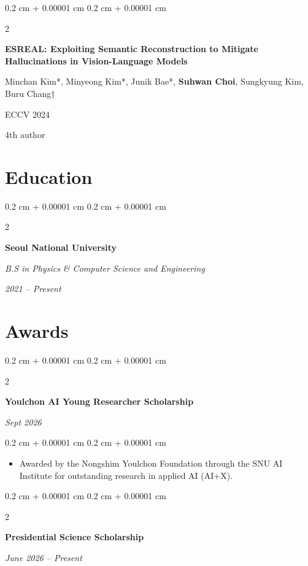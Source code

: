 \documentclass[10pt, letterpaper]{article}
\newenvironment{highlights}{
    \begin{itemize}[
        topsep=0.10 cm,
        parsep=0.10 cm,
        partopsep=0pt,
        itemsep=0pt,
        leftmargin=0.4 cm + 10pt
    ]
}{
    \end{itemize}
} %
\newenvironment{onecolentry}{
    \begin{adjustwidth}{
        0.2 cm + 0.00001 cm
    }{
        0.2 cm + 0.00001 cm
    }
}{
    \end{adjustwidth}
} %
\newenvironment{twocolentry}[2][]{
    \onecolentry
    \def\secondColumn{#2}
    \setcolumnwidth{\fill, 4.5 cm}
    \begin{paracol}{2}
}{
    \switchcolumn \raggedleft \secondColumn
    \end{paracol}
    \endonecolentry
} %
\newenvironment{pubentry}[2][]{
    \onecolentry
    \def\secondColumn{#2}
    \setcolumnwidth{\fill, 2 cm}
    \begin{paracol}{2}
}{
    \switchcolumn \raggedleft \secondColumn
    \end{paracol}
    \endonecolentry
} %
\begin{document}
\vspace{0.2 cm}

\begin{samepage}
    \begin{pubentry}{
            4th author
        }
        \textbf{ESREAL: Exploiting Semantic Reconstruction to Mitigate Hallucinations in Vision-Language Models}

        \vspace{0.10 cm}

        \small Minchan Kim*, Minyeong Kim*, Junik Bae*, \textbf{Suhwan Choi}, Sungkyung Kim, Buru Chang†

        \vspace{0.10 cm}

        ECCV 2024
    \end{pubentry}
\end{samepage}

\section{Education}

\begin{twocolentry}{
        \textit{2021 – Present}
    }
    \textbf{Seoul National University}

    \textit{B.S in Physics \& Computer Science and Engineering}
\end{twocolentry}


\section{Awards}

\begin{twocolentry}{
        \textit{Sept 2026}
    }
    \textbf{Youlchon AI Young Researcher Scholarship}
\end{twocolentry}

\vspace{0.10 cm}
\begin{onecolentry}
    \begin{highlights}
        \item Awarded by the Nongshim Youlchon Foundation through the SNU AI Institute for outstanding research in applied AI (AI+X).
    \end{highlights}
\end{onecolentry}

\vspace{0.2 cm}

\begin{twocolentry}{
        \textit{June 2026 – Present}
    }
    \textbf{Presidential Science Scholarship}
\end{twocolentry}
\end{document}
